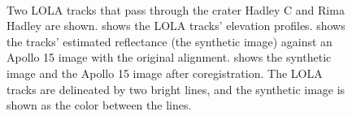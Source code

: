 \documentclass[float=false, crop=false]{standalone}
\begin{document}
\begin{figure}
	\centering
	\\
	\caption{Two LOLA tracks that pass through the crater Hadley C and Rima Hadley are
		shown.  shows the LOLA tracks' elevation profiles.
		 shows the tracks' estimated reflectance (the synthetic
		image) against an Apollo 15 image with the original alignment.
		 shows the synthetic image and the Apollo 15 image after
		coregistration. The LOLA tracks are delineated by two bright lines, and the synthetic
		image is shown as the color between the lines.}
	\label{fig:problem}
\end{figure}
\end{document}
